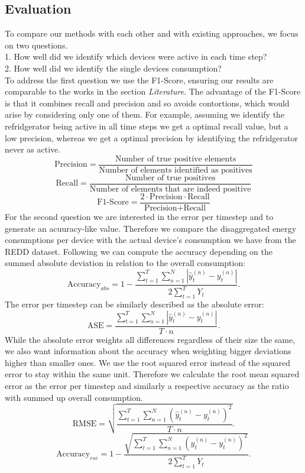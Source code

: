 \documentclass{article}
\begin{document}
\subsection{Evaluation}
To compare our methods with each other and with existing approaches, we focus on two questions.\\
1. How well did we identify which devices were active in each time step?\\
2. How well did we identify the single devices consumption?\\
To address the first question we use the F1-Score, ensuring our results are comparable to the works in the section \textit{Literature}. The 
advantage of the F1-Score is that it combines recall and precision and so avoids contortions, which would arise by considering only one of them. For example, assuming we 
identify the refridgerator being active in all time steps we get a optimal recall value, but a low precision, whereas we get a optimal precision 
by identifying the refridgerator never as active.
\[ \textrm{Precision} = \frac{\textrm{Number of true positive elements}}{\textrm{Number of elements identified as positives}}  \]
\[ \textrm{Recall} = \frac{\textrm{Number of true positives}}{\textrm{Number of elements that are indeed positive}}  \]
\[ \textrm{F1-Score} = \frac{2 \cdot \textrm{Precision} \cdot \textrm{Recall}}{\textrm{Precision} + \textrm{Recall}}\]
For the second question we are interested in the error per timestep and to generate an acuuracy-like value. Therefore we
compare the disaggregated energy consumptions per device with the actual device's consumption we have from the REDD
dataset. Following \cite{Redd} we can compute the accuracy depending on the summed absolute deviation in relation to 
the overall consumption:
\[\textrm{Accuracy}_{abs} = 1- \frac{\sum^{T}_{t=1}\sum^{N}_{n=1}|\hat{y}^{(n)}_t-y^{(n)}_t|}{2 \sum^{T}_{t=1}Y_t} .  \]
The error per timestep can be similarly described as the absolute error:
\[\textrm{ASE} = \frac{\sum^{T}_{t=1}\sum^{N}_{n=1}|\hat{y}^{(n)}_t-y^{(n)}_t|}{T \cdot n} .  \]
While the absolute error weights all differences regardless of their size the same, we also want information about the accuracy when 
weighting bigger deviations higher than smaller ones. We use the root squared error instead of the squared error 
to stay within the same unit. Therefore we calculate the root mean squared error as the error per timestep and similarly a respective 
accuracy as the ratio with summed up overall consumption.
\[\textrm{RMSE} = \sqrt{\frac{\sum^{T}_{t=1}\sum^{N}_{n=1}(\hat{y}^{(n)}_t-y^{(n)}_t)^2}{T \cdot n}} .  \]
\[\textrm{Accuracy}_{rse} = 1- \frac{\sqrt{\sum^{T}_{t=1}\sum^{N}_{n=1}(\hat{y}^{(n)}_t-y^{(n)}_t)^2}}{2 \sum^{T}_{t=1}Y_t} .  \]
\end{document}
